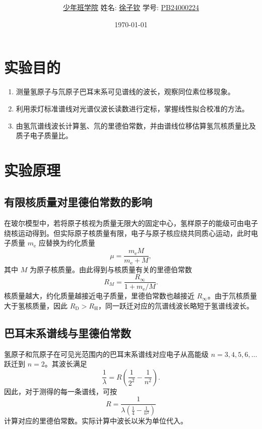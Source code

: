 \documentclass[12pt,a4paper]{article}
\title{\Huge{\textbf{\uuline{实\ 验\ 报\ 告}}}}
\author{\uline{少年班学院} \quad 姓名: \uline{徐子钦} \quad 学号: \uline{PB24000224}}
\date{\today}
\begin{document}
\maketitle

\section{实验目的}
\begin{enumerate}
    \item 测量氢原子与氘原子巴耳末系可见谱线的波长，观察同位素位移现象。
    \item 利用汞灯标准谱线对光谱仪波长读数进行定标，掌握线性拟合校准的方法。
    \item 由氢氘谱线波长计算氢、氘的里德伯常数，并由谱线位移估算氢氘核质量比及质子电子质量比。
\end{enumerate}

\section{实验原理}
\subsection{有限核质量对里德伯常数的影响}
在玻尔模型中，若将原子核视为质量无限大的固定中心，氢样原子的能级可由电子绕核运动得到。但实际原子核质量有限，电子与原子核应绕共同质心运动，此时电子质量 $m_{\mathrm e}$ 应替换为约化质量
\begin{equation}
    \mu=\frac{m_{\mathrm e}M}{m_{\mathrm e}+M},
\end{equation}
其中 $M$ 为原子核质量。由此得到与核质量有关的里德伯常数
\begin{equation}
    R_M=\frac{R_\infty}{1+m_{\mathrm e}/M}.
\end{equation}
核质量越大，约化质量越接近电子质量，里德伯常数也越接近 $R_\infty$。由于氘核质量大于氢核质量，因此 $R_{\mathrm D}>R_{\mathrm H}$，同一跃迁对应的氘谱线波长略短于氢谱线波长。

\subsection{巴耳末系谱线与里德伯常数}
氢原子和氘原子在可见光范围内的巴耳末系谱线对应电子从高能级 $n=3,4,5,6,\ldots$ 跃迁到 $n=2$。其波长满足
\begin{equation}
    \frac{1}{\lambda}=R\left(\frac{1}{2^2}-\frac{1}{n^2}\right).
    \label{eq:rydberg}
\end{equation}
因此，对于测得的每一条谱线，可按
\begin{equation}
    R=\frac{1}{\lambda\left(\frac{1}{4}-\frac{1}{n^2}\right)}
\end{equation}
计算对应的里德伯常数。实际计算中波长以米为单位代入。
\end{document}
